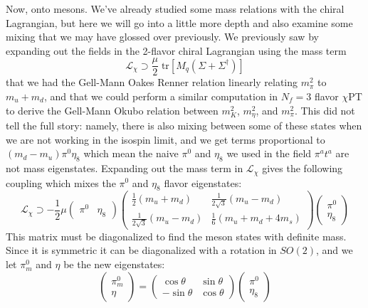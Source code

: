 \documentclass[11pt, oneside]{article}   	%
\theoremstyle{definition}
\numberwithin{equation}{subsection}		%
\begin{document}
Now, onto mesons. We've already studied some mass relations with the chiral Lagrangian, but here we will go into a little more depth and also examine some mixing that we 
may have glossed over previously. We previously saw by expanding out the fields in the 2-flavor chiral Lagrangian using the mass term
\begin{equation}
	\mathcal L_\chi\supset \frac{\mu}{2}\;\mathrm{tr}\left[M_q (\Sigma + \Sigma^\dagger)\right]
\end{equation}
that we had the Gell-Mann Oakes Renner relation linearly relating $m_\pi^2$ to $m_u + m_d$, and that we could perform a similar 
computation in $N_f = 3$ flavor $\chi$PT to derive the Gell-Mann Okubo relation between $m_K^2$, $m_\eta^2$, and 
$m_\pi^2$. This did not tell the full story: namely, there is also mixing between some of these states when we are not working in 
the isospin limit, and we get terms proportional to $(m_d - m_u) \pi^0 \eta_8$ which mean the naive $\pi^0$ and $\eta_8$ we used 
in the field $\pi^a t^a$ are not mass eigenstates. Expanding out the mass term in $\mathcal L_\chi$ gives the following coupling which mixes the 
$\pi^0$ and $\eta_8$ flavor eigenstates:
\begin{equation}
	\mathcal L_\chi\supset -\frac{1}{2}\mu\begin{pmatrix} \pi^0 & \eta_8 \end{pmatrix} \begin{pmatrix} \frac{1}{2} (m_u + m_d) & \frac{1}{2\sqrt 3} (m_u - m_d) \\ 
	\frac{1}{2\sqrt 3} (m_u - m_d) & \frac{1}{6} (m_u + m_d + 4 m_s) \end{pmatrix} \begin{pmatrix} \pi^0 \\ \eta_8 \end{pmatrix}
\end{equation}
This matrix must be diagonalized to find the meson states with definite mass. Since it is symmetric it can be diagonalized with a rotation in $SO(2)$, and we 
let $\pi^0_m$ and $\eta$ be the new eigenstates:
\begin{equation}
	\begin{pmatrix} \pi^0_m \\ \eta \end{pmatrix}  = \begin{pmatrix}\cos\theta & \sin\theta \\ -\sin\theta & \cos\theta \end{pmatrix} \begin{pmatrix} \pi^0 \\ \eta_8 \end{pmatrix}
\end{equation}
\end{document}
